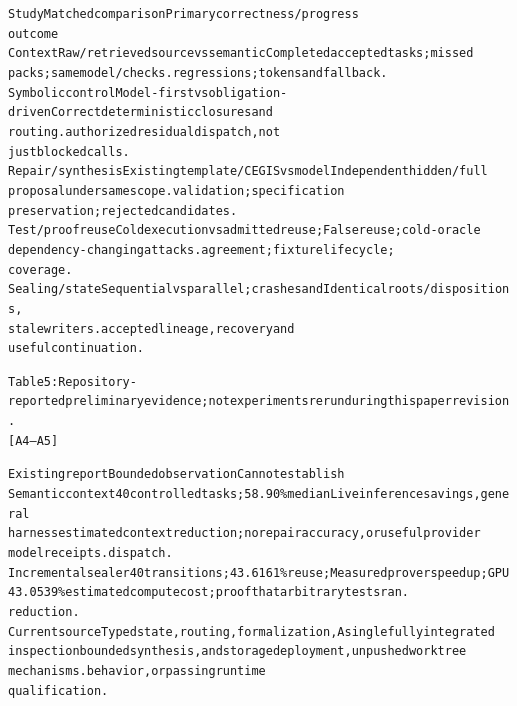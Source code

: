 \documentclass{article}
\begin{document}
\begingroup\fontsize{7}{8.4}\selectfont
\begin{alltt}
Study                     Matched comparison                        Primary correctness / progress
                                                                    outcome
Context                   Raw/retrieved source vs semantic          Completed accepted tasks; missed
                          packs; same model/checks.                 regressions; tokens and fallback.
Symbolic control          Model-first vs obligation-driven          Correct deterministic closures and
                          routing.                                  authorized residual dispatch, not
                                                                    just blocked calls.
Repair / synthesis        Existing template/CEGIS vs model          Independent hidden/full
                          proposal under same scope.                validation; specification
                                                                    preservation; rejected candidates.
Test / proof reuse        Cold execution vs admitted reuse;         False reuse; cold-oracle
                          dependency-changing attacks.              agreement; fixture lifecycle;
                                                                    coverage.
Sealing / state           Sequential vs parallel; crashes and       Identical roots/dispositions,
                          stale writers.                            accepted lineage, recovery and
                                                                    useful continuation.
\end{alltt}\endgroup



\begingroup\fontsize{7}{8.4}\selectfont
\begin{alltt}
Table 5: Repository-reported preliminary evidence; not experiments rerun during this paper revision.
[A4–A5]
\end{alltt}\endgroup

\begingroup\fontsize{7}{8.4}\selectfont
\begin{alltt}
Existing report           Bounded observation                       Cannot establish
Semantic context          40 controlled tasks; 58.90\% median        Live inference savings, general
harness                   estimated context reduction; no           repair accuracy, or useful provider
                          model receipts.                           dispatch.
Incremental sealer        40 transitions; 43.6161\% reuse;           Measured prover speedup; GPU
                          43.0539\% estimated compute                cost; proof that arbitrary tests ran.
                          reduction.
Current source            Typed state, routing, formalization,      A single fully integrated
inspection                bounded synthesis, and storage            deployment, unpushed worktree
                          mechanisms.                               behavior, or passing runtime
                                                                    qualification.
\end{alltt}\endgroup
\end{document}
